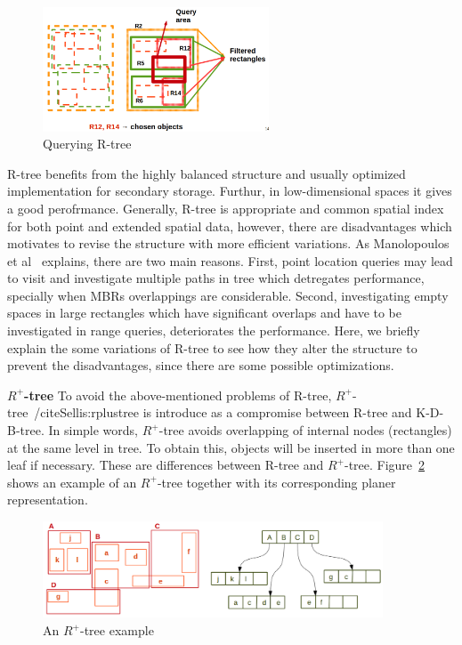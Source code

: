 \documentclass[a4paper,12pt]{article}
\begin{document}
\begin{figure}
\centering
\includegraphics[width=0.6\textwidth,height=0.2\textheight]{Rtree-query}
\caption{Querying R-tree}
\label{rtreequery}
\end{figure}

R-tree benefits from the highly balanced structure and usually optimized implementation for secondary storage. Furthur, in low-dimensional spaces it gives a good perofrmance. Generally, R-tree is appropriate and common spatial index for both point and extended spatial data, however, there are disadvantages which motivates to revise the structure with more efficient variations. As Manolopoulos et al~\cite{Manolopoulos:2005} explains, there are two main reasons. First, point location queries may lead to visit and investigate multiple paths in tree which detregates performance, specially when MBRs overlappings are considerable. Second, investigating empty spaces in large rectangles which have significant overlaps and have to be investigated in range queries, deteriorates the performance. Here, we briefly explain the some variations of R-tree to see how they alter the structure to prevent the disadvantages, since there are some possible optimizations.


\textbf{$R^+$-tree}
To avoid the above-mentioned problems of R-tree, $R^+$-tree~/cite{Sellis:rplustree} is introduce as a compromise between R-tree and K-D-B-tree. In simple words, $R^+$-tree avoids overlapping of internal nodes (rectangles) at the same level in tree. To obtain this, objects will be inserted in more than one leaf if necessary. These are differences between R-tree and $R^+$-tree. Figure~\ref{r+tree} shows an example of an $R^+$-tree together with its corresponding planer representation.


\begin{figure}
\centering
\includegraphics[width=0.9\textwidth]{r+tree}
\caption{An {$R^+$-tree} example}
\label{r+tree}
\end{figure}
\end{document}
